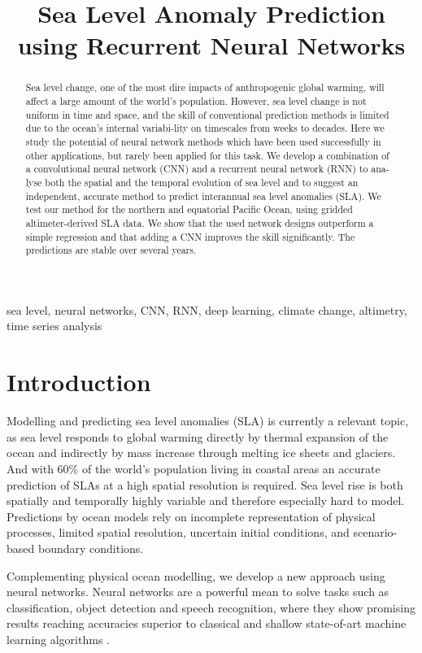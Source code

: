 \documentclass{article}
\title{Sea Level Anomaly Prediction using Recurrent Neural Networks}
\begin{document}
%
\maketitle
%
\begin{abstract}
Sea level change, one of the most dire impacts of anthropogenic global warming, will affect a large amount of the world's population. However, sea level change is not uniform in time and space, and the skill of conventional prediction methods is limited due to the ocean's internal variabi-lity on timescales from weeks to decades. Here we study the potential of neural network methods which have been used successfully in other applications, but rarely been applied for this task.
We develop a combination of a convolutional neural network (CNN) and a recurrent neural network (RNN) to ana-lyse both the spatial and the temporal evolution of sea level and to suggest an independent, accurate method to predict interannual sea level anomalies (SLA). 
We test our method for the northern and equatorial Pacific Ocean, using gridded altimeter-derived SLA data.
We show that the used network designs outperform a simple regression and that adding a CNN improves the skill significantly. The predictions are stable over several years. 
\end{abstract}
%
\begin{keywords}
sea level, neural networks, CNN, RNN, deep learning, climate change, altimetry, time series analysis
\end{keywords}

\section{Introduction}
\label{sec:intro}

Modelling and predicting sea level anomalies (SLA) is currently a relevant topic, as sea level responds to global warming directly by thermal expansion of the ocean and indirectly by mass increase through melting ice sheets and glaciers. 
And with 60\% of the world's population living in coastal areas an accurate prediction of SLAs at a high spatial resolution is required. Sea level rise is both spatially and temporally highly variable and therefore especially hard to model. 
Predictions by ocean models rely on incomplete representation of physical processes, limited spatial resolution, uncertain initial conditions, and scenario-based boundary conditions. 

Complementing physical ocean modelling, we develop a new approach using neural networks. Neural networks are a powerful mean to solve tasks such as classification, object detection and speech recognition, where they show promising results reaching accuracies superior to classical and shallow state-of-art machine learning algorithms \cite{c22}. 
\end{document}
